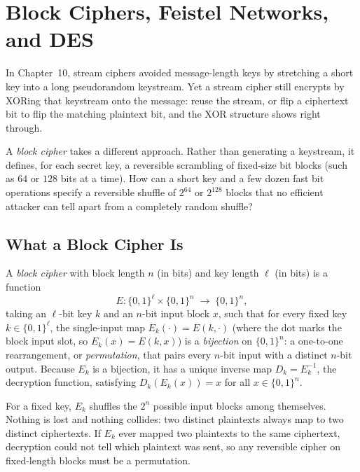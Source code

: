 \chapter{Block Ciphers, Feistel Networks, and DES}

In Chapter~10, stream ciphers avoided message-length keys by stretching a short key into a long pseudorandom keystream. Yet a stream cipher still encrypts by XORing that keystream onto the message: reuse the stream, or flip a ciphertext bit to flip the matching plaintext bit, and the XOR structure shows right through.

A \emph{block cipher} takes a different approach. Rather than generating a keystream, it defines, for each secret key, a reversible scrambling of fixed-size bit blocks (such as $64$ or $128$ bits at a time). How can a short key and a few dozen fast bit operations specify a reversible shuffle of $2^{64}$ or $2^{128}$ blocks that no efficient attacker can tell apart from a completely random shuffle?

\chapterline

\section{What a Block Cipher Is}
\label{ch11:what}

\begin{definition}
\label{ch11:def-blockcipher}
A \emph{block cipher} with block length $n$ (in bits) and key length $\ell$ (in bits) is a function
\[
E : \{0,1\}^{\ell} \times \{0,1\}^{n} \;\longrightarrow\; \{0,1\}^{n},
\]
taking an $\ell$-bit key $k$ and an $n$-bit input block $x$, such that for every fixed key $k \in \{0,1\}^{\ell}$, the single-input map $E_k(\cdot) = E(k,\cdot)$ (where the dot marks the block input slot, so $E_k(x) = E(k, x)$) is a \emph{bijection} on $\{0,1\}^{n}$: a one-to-one rearrangement, or \emph{permutation}, that pairs every $n$-bit input with a distinct $n$-bit output. Because $E_k$ is a bijection, it has a unique inverse map $D_k = E_k^{-1}$, the decryption function, satisfying $D_k(E_k(x)) = x$ for all $x \in \{0,1\}^n$.
\end{definition}

For a fixed key, $E_k$ shuffles the $2^n$ possible input blocks among themselves. Nothing is lost and nothing collides: two distinct plaintexts always map to two distinct ciphertexts. If $E_k$ ever mapped two plaintexts to the same ciphertext, decryption could not tell which plaintext was sent, so any reversible cipher on fixed-length blocks must be a permutation.

